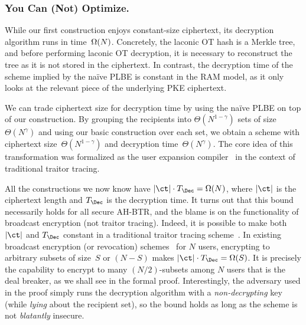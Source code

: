 \subsubsection{You Can (Not) Optimize.}
While our first construction enjoys constant-size ciphertext,
its decryption algorithm runs in time~$\operatorname{\Omega}(N)$.
Concretely, the laconic OT hash is a Merkle tree, and before performing laconic OT decryption, it is necessary to reconstruct the tree as it is not stored in the ciphertext.
In contrast, the decryption time of the scheme implied by the na{\"i}ve PLBE is constant in the RAM model, as it only looks at the relevant piece of the underlying PKE ciphertext.

We can trade ciphertext size for decryption time by using the na{\"i}ve PLBE on top of our construction.
By grouping the recipients into $\Theta(N^{1-\gamma})$ sets of size~$\Theta(N^\gamma)$ and using our basic construction over each set, we obtain a scheme with ciphertext size~$\Theta(N^{1-\gamma})$ and decryption time~$\Theta(N^\gamma)$.
The core idea of this transformation was formalized as the user expansion compiler~\cite{C:Zhandry20} in the context of traditional traitor tracing.

All the constructions we now know have ${|\ct|\cdot T_\Dec=\bigOmega(N)}$,
where $|\ct|$ is the ciphertext length and $T_\Dec$ is the decryption time.
It turns out that this bound necessarily holds for all secure AH-BTR, and
the blame is on the functionality of broadcast encryption (not traitor tracing).
Indeed, 
it is possible to make both $|\ct|$ and $T_\Dec$ constant in a traditional traitor tracing scheme~\cite{C:BonZha14}.
In existing broadcast encryption (or revocation) schemes~\cite{C:BonGenWat05,AC:Delerablee07,EC:GenWat09,C:BonZha14,EC:AgrYam20,TCC:AgrWicYam20,EPRINT:BraVai20} for $N$ users,
encrypting to arbitrary subsets of size~$S$ or $({N-S})$ makes ${|\ct|\cdot T_\Dec=\Omega(S)}$.
It is precisely the capability to encrypt to many ${(N/2)}$-subsets among $N$ users that is the deal breaker, as we shall see in the formal proof.
Interestingly,
the adversary used in the proof
simply runs the decryption algorithm with a \emph{non-decrypting} key
(while \emph{lying} about the recipient set),
so the bound holds as long as the scheme is not \emph{blatantly} insecure.

